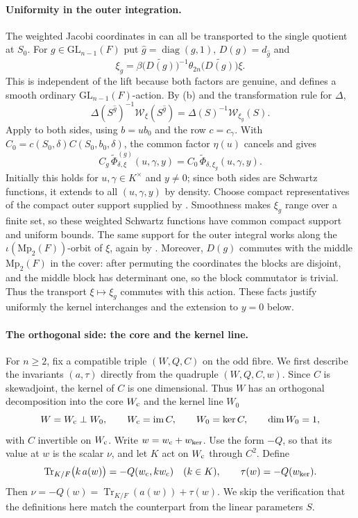 \documentclass[11pt,oneside,notitlepage]{book}
\numberwithin{equation}{section}
\theoremstyle{plain}
\theoremstyle{definition}
\newcommand{\GL}{\mathrm{GL}}
\newcommand{\Mp}{\mathrm{Mp}}
\newcommand{\cW}{\mathcal{W}}
\newcommand{\Tr}{\operatorname{Tr}}
\newcommand{\diag}{\operatorname{diag}}
\begin{document}
\paragraph{Uniformity in the outer integration.}
The weighted Jacobi coordinates in  can all be transported to the single quotient at $S_0$. For $g\in\GL_{n-1}(F)$ put $\hat g=\diag(g,1)$, $D(g)=d_{\hat g}$ and
\[
\xi_g=\beta\bigl(\widetilde{D(g)}\bigr)^{-1}
\theta_{2n}\bigl(\widetilde{D(g)}\bigr)\xi.
\]
This is independent of the lift because both factors are genuine, and defines a smooth ordinary $\GL_{n-1}(F)$-action. By (b) and the transformation rule for $\Delta$,
\[
\Delta(S^{\hat g})^{-1}\cW_\xi(S^{\hat g})
=\Delta(S)^{-1}\cW_{\xi_g}(S).
\]
Apply  to both sides, using $b=ub_0$ and the row $c=c_\gamma$. With $C_0=c(S_0,\delta)C(S_0,b_0,\delta)$, the common factor $\eta(u)$ cancels and gives
\[
C_g\,\tilde\Phi^{(g)}_{\delta,\xi}(u,\gamma,y)
=C_0\,\tilde\Phi_{\delta,\xi_g}(u,\gamma,y).
\]
Initially this holds for $u,\gamma\in K^\times$ and $y\ne0$; since both sides are Schwartz functions, it extends to all $(u,\gamma,y)$ by density. Choose compact representatives of the compact outer support supplied by . Smoothness makes $\xi_g$ range over a finite set, so these weighted Schwartz functions have common compact support and uniform bounds. The same support for the outer integral works along the $\iota(\Mp_2(F))$-orbit of $\xi$, again by . Moreover, $D(g)$ commutes with the middle $\Mp_2(F)$ in the cover: after permuting the coordinates the blocks are disjoint, and the middle block has determinant one, so the block commutator is trivial. Thus the transport $\xi\mapsto\xi_g$ commutes with this action. These facts justify uniformly the kernel interchanges and the extension to $y=0$ below.

\paragraph{The orthogonal side: the core and the kernel line.}
\label{par:odd-norm-coordinates}
For $n\ge2$, fix a compatible triple $(W,Q,C)$ on the odd fibre. We first describe the invariants $(a,\tau)$ directly from the quadruple $(W,Q,C,w)$. Since $C$ is skewadjoint, the kernel of $C$ is one dimensional. Thus $W$  has an orthogonal decomposition into the core $W_{\rm c}$ and the kernel line $W_0$
\[
W=W_{\rm c}\perp W_0,\qquad
W_{\rm c}=\operatorname{im}C,\qquad W_0=\ker C,\qquad \dim W_0=1,
\]
with $C$ invertible on $W_{\rm c}$. Write $w=w_{\rm c}+w_{\ker}$. Use the form $-Q$, so that its value at $w$ is the scalar $\nu$, and let $K$ act on $W_{\rm c}$ through $C^2$. Define
\[
\Tr_{K/F}\bigl(k\,a(w)\bigr)=-Q(w_{\rm c},kw_{\rm c})\quad(k\in K),
\qquad \tau(w)=-Q(w_{\ker}).
\]
Then $\nu=-Q(w)=\Tr_{K/F}(a(w))+\tau(w)$. We skip the verification that the definitions here match the counterpart from the linear parameters $S$.
\end{document}
